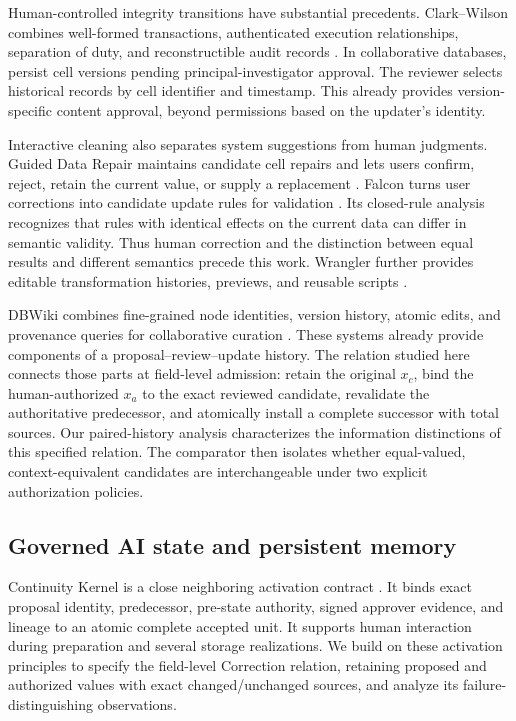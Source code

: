 Human-controlled integrity transitions have substantial precedents. Clark--Wilson combines well-formed transactions, authenticated execution relationships, separation of duty, and reconstructible audit records \citep{clark1987integrity}. In collaborative databases, \citet{mershad2015approval} persist cell versions pending principal-investigator approval. The reviewer selects historical records by cell identifier and timestamp. This already provides version-specific content approval, beyond permissions based on the updater's identity.

Interactive cleaning also separates system suggestions from human judgments. Guided Data Repair maintains candidate cell repairs and lets users confirm, reject, retain the current value, or supply a replacement \citep{yakout2011guided}. Falcon turns user corrections into candidate update rules for validation \citep{he2016falcon}. Its closed-rule analysis recognizes that rules with identical effects on the current data can differ in semantic validity. Thus human correction and the distinction between equal results and different semantics precede this work. Wrangler further provides editable transformation histories, previews, and reusable scripts \citep{kandel2011wrangler}.

DBWiki combines fine-grained node identities, version history, atomic edits, and provenance queries for collaborative curation \citep{buneman2011dbwiki}. These systems already provide components of a proposal--review--update history. The relation studied here connects those parts at field-level admission: retain the original $x_c$, bind the human-authorized $x_a$ to the exact reviewed candidate, revalidate the authoritative predecessor, and atomically install a complete successor with total sources. Our paired-history analysis characterizes the information distinctions of this specified relation. The comparator then isolates whether equal-valued, context-equivalent candidates are interchangeable under two explicit authorization policies.

\subsection{Governed AI state and persistent memory}

Continuity Kernel is a close neighboring activation contract \citep{he2026continuity}. It binds exact proposal identity, predecessor, pre-state authority, signed approver evidence, and lineage to an atomic complete accepted unit. It supports human interaction during preparation and several storage realizations. We build on these activation principles to specify the field-level Correction relation, retaining proposed and authorized values with exact changed/unchanged sources, and analyze its failure-distinguishing observations.


